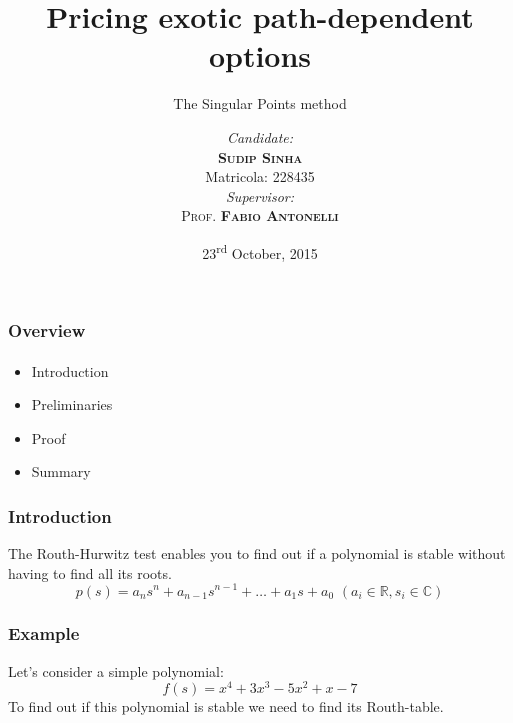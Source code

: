 \documentclass[utf8]{beamer}
\begin{document}
\ECFAugie

\title{Pricing exotic path-dependent options}
\subtitle{The Singular Points method}
\date[2015-10-23]{23\textsuperscript{rd} October, 2015}
\author{
	\begin{minipage}[t]{0.4\textwidth}
		\begin{center}
			\emph{Candidate:}\\
			{\textbf{\textsc{Sudip Sinha}}}\\
			Matricola: 228435
		\end{center}
	\end{minipage}
	\begin{minipage}[t]{0.5\textwidth}
		\begin{center}
			\emph{Supervisor:} \\
			\textsc{Prof. \textbf{Fabio Antonelli}}
		\end{center}
	\end{minipage}
	}


\begin{frame}[plain]
	\maketitle
\end{frame}

\begin{frame}[t]
	\frametitle{Overview}
	\framesubtitle{}
	\begin{itemize}
		\item Introduction
		\item Preliminaries
		\item Proof
		\item Summary
	\end{itemize}
\end{frame}

\begin{frame}[t]
	\frametitle{Introduction}
	The Routh-Hurwitz test enables you to find out if a polynomial is stable without having to find all its roots.
	\begin{equation}
		p(s) = a_n s^n + a_{n-1} s^{n-1} + \ldots + a_1 s + a_0 \,\, (a_i \in \mathbb{R}, s_i \in \mathbb{C})
	\end{equation}
\end{frame}

\begin{frame}[t]
	\frametitle{Example}
	Let's consider a simple polynomial:
	\begin{equation}
		f(s) = x^4 + 3 x^3 - 5 x^2 + x - 7
	\end{equation}
	To find out if this polynomial is stable we need to find its Routh-table.
\end{frame}
\end{document}
